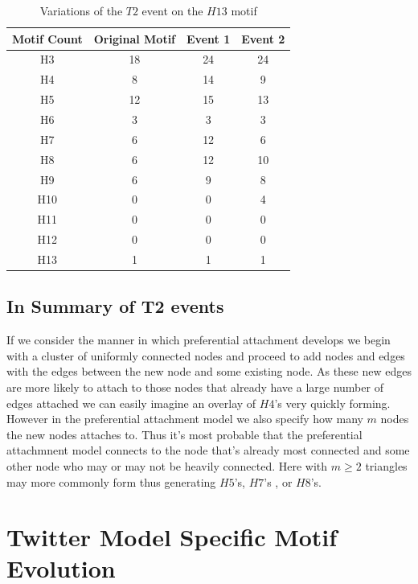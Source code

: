 \begin{table}
    \centering
    \begin{tabular}{||c c c c||} 
    \hline
    Motif Count & Original Motif & Event 1 & Event 2 \\ [0.5ex] 
    \hline\hline
    H3 & 18 & 24 & 24\\ 
    \hline
    H4 & 8 & 14 & 9  \\
    \hline
    H5 & 12 & 15 & 13  \\
    \hline
    H6 & 3 & 3 &3  \\
    \hline
    H7 & 6 & 12 & 6 \\
    \hline
    H8 & 6 & 12 & 10\\
    \hline
    H9 & 6 & 9 & 8 \\
    \hline
    H10 & 0 & 0 & 4  \\
    \hline
    H11 & 0 & 0 & 0  \\
    \hline
    H12 & 0 & 0 & 0 \\
    \hline
    H13 & 1 & 1 & 1 \\
    \hline
   \end{tabular}
   \caption{Variations of the $T2$ event on the $H13$ motif}
   \label{table:11}
\end{table}

\section{In Summary of T2 events}

If we consider the manner in which preferential attachment develops we begin with a cluster of uniformly
connected nodes and proceed to add nodes and edges with the edges between the new node and some existing node.
As these new edges are more likely to attach to those nodes that already have a large number
of edges attached we can easily imagine an overlay of $H4$'s very quickly forming. However in the 
preferential attachment model we also specify how many $m$ nodes the new nodes attaches to. Thus it's most probable
that the preferential attachmnent model connects to the node that's already most connected 
and some other node who may or may not be heavily connected. Here with $m \geq 2$ triangles may more 
commonly form thus generating $H5$'s, $H7$'s , or $H8$'s.

\chapter{Twitter Model Specific Motif Evolution}

